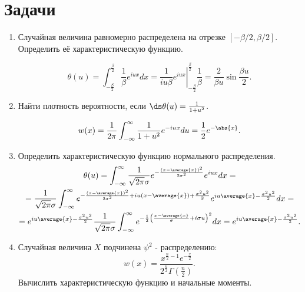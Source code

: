 \section{Задачи}
\begin{enumerate}
    \item Случайная величина равномерно распределена на отрезке
        \( [-\beta/2, \beta/2] \). Определить её характеристическую функцию.

        \[
            \theta(u) = \int_{-\frac{\beta}{2}}^\frac{\beta}{2} \frac{1}{\beta}
            e^{iux}dx = \left.\frac{1}{iu\beta}
            e^{iux}\right|_{-\frac{\beta}{2}}^\frac{\beta}{2} \frac{1}{\beta} =
            \frac{2}{\beta u}\sin\frac{\beta u}{2}.
        \]
    \item Найти плотность вероятности, если
        \( \ds \theta(u) = \frac{1}{1+u^2} \).

        \[
            w(x) = \frac{1}{2\pi}\int_{-\infty}^\infty
            \frac{1}{1+u^2} e^{-iux} du = \frac{1}{2}e^{-\abs{x}}.
        \]
    \item Определить характеристическую функцию нормального распределения.
        \begin{gather*}
            \theta(u) = \int_{-\infty}^\infty \frac{1}{\sqrt{2\pi}\sigma}
            e^{-\frac{(x-\average{x})^2}{2\sigma^2}} e^{iux} dx
            =\\=
            \frac{1}{\sqrt{2\pi}\sigma} \int_{-\infty}^\infty
            e^{-\frac{(x-\average{x})^2}{2\sigma^2} + iu(x-\average{x}) +
            \frac{\sigma^2u^2}{2}} e^{iu\average{x} - \frac{\sigma^2u^2}{2}} dx
            =\\=
            e^{iu\average{x} - \frac{\sigma^2u^2}{2}}
            \frac{1}{\sqrt{2\pi}\sigma}\int_{-\infty}^\infty
            e^{-\frac{1}{2}\left(\frac{x-\average{x}}{\sigma} + i\sigma
            u\right)^2} dx = e^{iu\average{x} - \frac{\sigma^2u^2}{2}}.
        \end{gather*}
    \item Случайная величина \( X \) подчинена \( \psi^2 \) - распределению:
        \[
            w(x) = \frac{x^{\frac{n}{2}-1}e^{-\frac{x}{2}}}
            {2^\frac{n}{2}\Gamma\left(\frac{n}{2}\right)}.
        \]
        Вычислить характеристическую функцию и начальные моменты.


\end{enumerate}
